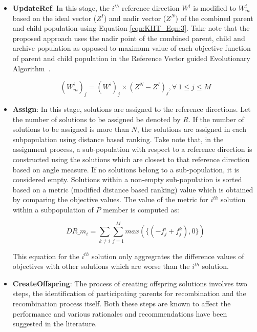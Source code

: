 \documentclass{sig-alternate}
\begin{document}
\begin{itemize}
	\item \textbf{UpdateRef}: In this stage, the $i^{th}$ reference direction $W^i$ is modified to $W^i_m$ based on the ideal vector ($Z^I$) and nadir vector ($Z^N$) of the combined parent and child population using Equation \ref{eqn:KHT_Eqn:3}. Take note that the proposed approach uses the nadir point of the combined parent, child and archive population as opposed to maximum value of each objective function of parent and child population in the Reference Vector guided Evolutionary Algorithm~\cite{Cheng2016many}. 
	
	\begin{equation}
	(W^i_m)_j = (W^i)_j\times(Z^N - Z^I)_j, \forall~1\le j\le M
	\label{eqn:KHT_Eqn:3}
	\end{equation}
	
	
	\item \textbf{Assign}: In this stage, solutions are assigned to the reference directions. Let the number of solutions to be assigned be denoted by $R$. If the number of solutions to be assigned is more than $N$, the solutions are assigned in each subpopulation using distance based ranking. Take note that, in the assignment process, a sub-population with respect to a reference direction is constructed using the solutions which are closest to that reference direction based on angle measure. If no solutions belong to a sub-population, it is considered empty. Solutions within a non-empty sub-population is sorted based on a metric (modified distance based ranking) value which is obtained by comparing the objective values. The value of the metric for $i^{th}$ solution within a subpopulation of $P$ member is computed as:
	
	\begin{equation}
	DR\_m_i = \sum_{k\neq i}\sum_{j=1}^M max(\{(- f^i_j + f^k_j),0\}) 
	\label{eqn:KHT_Eqn:4}
	\end{equation}
	
	This equation for the $i^{th}$ solution only aggregrates the difference values of objectives with other solutions which are worse than the $i^{th}$ solution.
	
	\item \textbf{CreateOffspring}: The process of creating offspring solutions involves two steps, the identification of participating parents for recombination and the recombination process itself. Both these steps are known to affect the performance and various rationales and recommendations have been suggested in the literature. 
	

\end{itemize}
\end{document}
